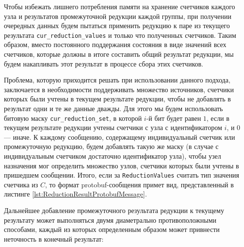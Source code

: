 \documentclass{article}
\theoremstyle{plain}
\theoremstyle{plain}
\theoremstyle{plain}
\theoremstyle{plain}
\theoremstyle{definition}
\theoremstyle{remark}
\theoremstyle{plain}
\begin{document}
Чтобы избежать лишнего потребления памяти на хранение счетчиков каждого узла и результатов промежуточной редукции каждой группы, при получении очередных данных будем пытаться применить редукцию к паре из текущего результата \texttt{cur\_re\-duc\-ti\-on\_values} и только что полученных счетчиков. Таким образом, вместо постоянного поддержания состояния в виде значений всех счетчиков, которые должны в итоге составить общий результат редукции, мы будем накапливать этот результат в процессе сбора этих счетчиков.

Проблема, которую приходится решать при использовании данного подхода, заключается в необходимости поддерживать множество источников, счетчики которых были учтены в текущем результате редукции, чтобы не добавлять в результат одни и те же данные дважды. Для этого мы будем использовать битовую маску \texttt{cur\_re\-duc\-ti\-on\_set}, в которой $i$-й бит будет равен $1$, если в текущем результате редукции учтены счетчики с узла с идентификатором $i$, и $0$ --- иначе. К каждому сообщению, содержащему индивидуальный счетчик или промежуточную редукцию, будем добавлять такую же маску (в случае с индивидуальным счетчиком достаточно идентификатор узла), чтобы узел назначения мог определить множество узлов, счетчики которых были учтены в пришедшем сообщении. Итого, если за \texttt{ReductionValues} считать тип значения счетчика из $C$, то формат protobuf-сообщения примет вид, представленный в листинге \ref{lst:ReductionResultProtobufMessage}.


Дальнейшее добавление промежуточного результата редукции к текущему результату может выполняться двумя диаметрально противоположными способами, каждый из которых определенным образом может привнести неточность в конечный результат:
\end{document}
